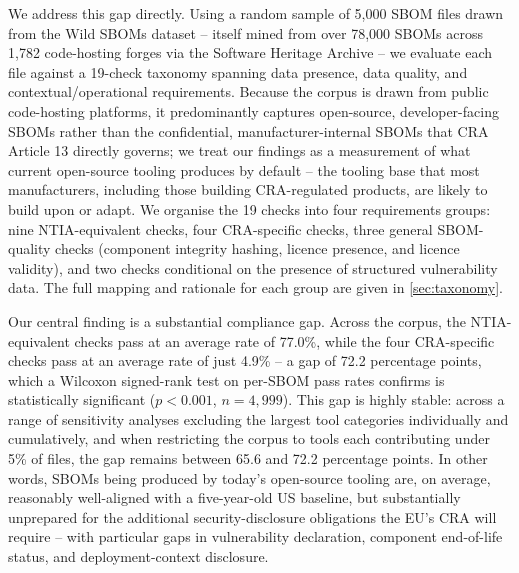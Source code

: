 \documentclass[11pt]{article}
\begin{document}
We address this gap directly. Using a random sample of 5,000 SBOM files drawn from the Wild SBOMs dataset \cite{soeiro2025} -- itself mined from over 78,000 SBOMs across 1,782 code-hosting forges via the Software Heritage Archive -- we evaluate each file against a 19-check taxonomy spanning data presence, data quality, and contextual/operational requirements. Because the corpus is drawn from public code-hosting platforms, it predominantly captures open-source, developer-facing SBOMs rather than the confidential, manufacturer-internal SBOMs that CRA Article 13 directly governs; we treat our findings as a measurement of what current open-source tooling produces by default -- the tooling base that most manufacturers, including those building CRA-regulated products, are likely to build upon or adapt. We organise the 19 checks into four requirements groups: nine NTIA-equivalent checks, four CRA-specific checks, three general SBOM-quality checks (component integrity hashing, licence presence, and licence validity), and two checks conditional on the presence of structured vulnerability data. The full mapping and rationale for each group are given in \cref{sec:taxonomy}.

Our central finding is a substantial compliance gap. Across the corpus, the NTIA-equivalent checks pass at an average rate of 77.0\%, while the four CRA-specific checks pass at an average rate of just 4.9\% -- a gap of 72.2 percentage points, which a Wilcoxon signed-rank test on per-SBOM pass rates confirms is statistically significant ($p<0.001$, $n=4{,}999$). This gap is highly stable: across a range of sensitivity analyses excluding the largest tool categories individually and cumulatively, and when restricting the corpus to tools each contributing under 5\% of files, the gap remains between 65.6 and 72.2 percentage points. In other words, SBOMs being produced by today's open-source tooling are, on average, reasonably well-aligned with a five-year-old US baseline, but substantially unprepared for the additional security-disclosure obligations the EU's CRA will require -- with particular gaps in vulnerability declaration, component end-of-life status, and deployment-context disclosure.
\end{document}
